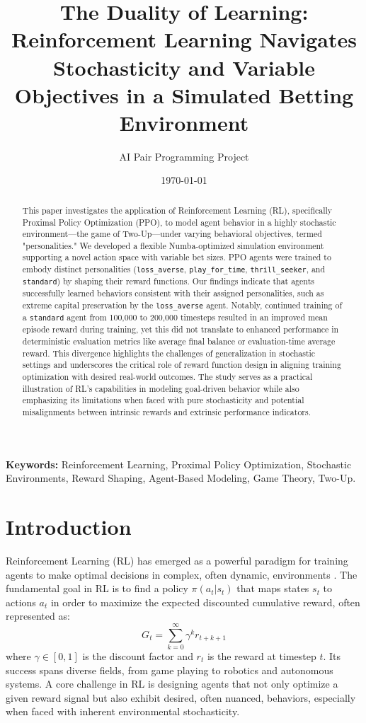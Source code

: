 \documentclass{article}
\title{The Duality of Learning: Reinforcement Learning Navigates Stochasticity and Variable Objectives in a Simulated Betting Environment}
\author{AI Pair Programming Project}
\date{\today}
\begin{document}
\maketitle

\begin{abstract}
This paper investigates the application of Reinforcement Learning (RL), specifically Proximal Policy Optimization (PPO), to model agent behavior in a highly stochastic environment—the game of Two-Up—under varying behavioral objectives, termed "personalities." We developed a flexible Numba-optimized simulation environment supporting a novel action space with variable bet sizes. PPO agents were trained to embody distinct personalities (\texttt{loss\_averse}, \texttt{play\_for\_time}, \texttt{thrill\_seeker}, and \texttt{standard}) by shaping their reward functions. Our findings indicate that agents successfully learned behaviors consistent with their assigned personalities, such as extreme capital preservation by the \texttt{loss\_averse} agent. Notably, continued training of a \texttt{standard} agent from 100,000 to 200,000 timesteps resulted in an improved mean episode reward during training, yet this did not translate to enhanced performance in deterministic evaluation metrics like average final balance or evaluation-time average reward. This divergence highlights the challenges of generalization in stochastic settings and underscores the critical role of reward function design in aligning training optimization with desired real-world outcomes. The study serves as a practical illustration of RL's capabilities in modeling goal-driven behavior while also emphasizing its limitations when faced with pure stochasticity and potential misalignments between intrinsic rewards and extrinsic performance indicators.
\end{abstract}

\noindent
\textbf{Keywords:} Reinforcement Learning, Proximal Policy Optimization, Stochastic Environments, Reward Shaping, Agent-Based Modeling, Game Theory, Two-Up.

\section{Introduction}

Reinforcement Learning (RL) has emerged as a powerful paradigm for training agents to make optimal decisions in complex, often dynamic, environments \cite{SuttonBarto2018}. The fundamental goal in RL is to find a policy \(\pi(a_t|s_t)\) that maps states \(s_t\) to actions \(a_t\) in order to maximize the expected discounted cumulative reward, often represented as:
\[ G_t = \sum_{k=0}^\infty \gamma^k r_{t+k+1} \]
where \(\gamma \in [0, 1]\) is the discount factor and \(r_t\) is the reward at timestep \(t\). Its success spans diverse fields, from game playing \cite{Mnih2015, Silver2016} to robotics and autonomous systems. A core challenge in RL is designing agents that not only optimize a given reward signal but also exhibit desired, often nuanced, behaviors, especially when faced with inherent environmental stochasticity.
\end{document}
